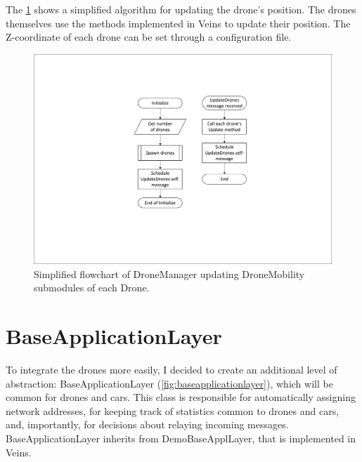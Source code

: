 \documentclass[]{nsm-thesis}
\begin{document}
The \cref{fig:dronemanagerflow} shows a simplified algorithm for updating the drone's position. The drones themselves use the methods implemented in Veins to update their position. The Z-coordinate of each drone can be set through a configuration file.

\begin{figure}
	\centering
	\includegraphics[width=1\textwidth]{figures/DroneManager.pdf}
	\caption{Simplified flowchart of DroneManager updating DroneMobility submodules of each Drone.}
	\label{fig:dronemanagerflow}
\end{figure}


\section{BaseApplicationLayer}

To integrate the drones more easily, I decided to create an additional level of abstraction: BaseApplicationLayer (\cref{fig:baseapplicationlayer}), which will be common for drones and cars. This class is responsible for automatically assigning network addresses, for keeping track of statistics common to drones and cars, and, importantly, for decisions about relaying incoming messages. BaseApplicationLayer inherits from DemoBaseApplLayer, that is implemented in Veins.
\end{document}

